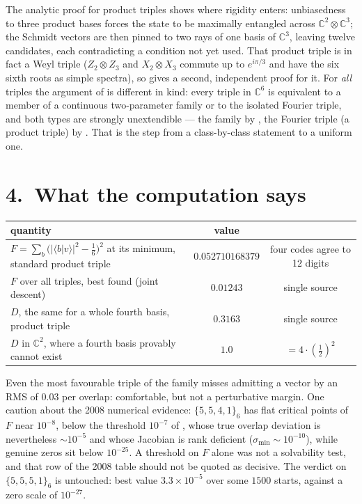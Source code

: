 \documentclass[10pt]{article}
\newcommand{\C}{\mathbb{C}}
\newcommand{\abs}[1]{\lvert #1\rvert}
\newcommand{\ip}[2]{\langle #1|#2\rangle}
\newcommand{\dev}[1]{\bigl(\abs{#1}^{2}-\tfrac16\bigr)^{2}}
\begin{document}
The analytic proof for product triples \cite{MW12} shows where rigidity enters: unbiasedness to three
product bases forces the state to be maximally entangled across $\C^2\otimes\C^3$; the Schmidt vectors
are then pinned to two rays of one basis of $\C^3$, leaving twelve candidates, each contradicting a
condition not yet used. That product triple is in fact a Weyl triple ($Z_2\otimes Z_3$ and
$X_2\otimes X_3$ commute up to $e^{i\pi/3}$ and have the six sixth roots as simple spectra), so
\cite{Grassl04} gives a second, independent proof for it. For \emph{all} triples the argument of
\cite{CWT26} is different in kind: every triple in $\C^6$ is equivalent to a member of a continuous
two-parameter family or to the isolated Fourier triple, and both types are strongly unextendible --- the
family by \cite[Cor.~9.1]{Sun26}, the Fourier triple (a product triple) by \cite{MW12}. That is the step
from a class-by-class statement to a uniform one.

\section*{4.\ What the computation says}

\begin{center}
\small
\begin{tabular}{@{}lcc@{}}
\toprule
quantity & value & \\
\midrule
$F=\sum_{b}\dev{\ip{b}{v}}$ at its minimum, standard product triple & $0.052710168379$ & four codes agree to 12 digits\\
$F$ over all triples, best found (joint descent) & $0.01243$ & single source\\
$D$, the same for a whole fourth basis, product triple & $0.3163$ & single source\\
$D$ in $\C^2$, where a fourth basis provably cannot exist & $1.0$ & $=4\cdot(\tfrac12)^2$\\
\bottomrule
\end{tabular}
\end{center}

Even the most favourable triple of the family misses admitting a vector by an RMS of $0.03$ per overlap:
comfortable, but not a perturbative margin. One caution about the 2008 numerical evidence:
$\{5,5,4,1\}_6$ has flat critical points of $F$ near $10^{-8}$, below the threshold $10^{-7}$ of
\cite{BW08}, whose true overlap deviation is nevertheless $\sim10^{-5}$ and whose Jacobian is rank
deficient ($\sigma_{\min}\sim10^{-10}$), while genuine zeros sit below $10^{-25}$. A threshold on $F$
alone was not a solvability test, and that row of the 2008 table should not be quoted as decisive. The
verdict on $\{5,5,5,1\}_6$ is untouched: best value $3.3\times10^{-5}$ over some $1500$ starts, against
a zero scale of $10^{-27}$.
\end{document}
